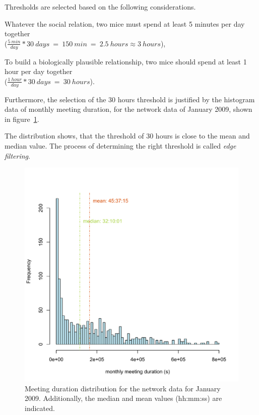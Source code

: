 Thresholds are selected based on the following considerations.
\begin{mylist}
\item Whatever the social relation, two mice must spend at least 5 minutes per day together \\ ($\frac{5\:min}{day} * 30\:days\:=\:150\:min\:=\:2.5\:hours \approx 3\:hours$),
\item To build a biologically plausible relationship, two mice should spend at least 1 hour per day together \\ ($\frac{1\:hour}{day} * 30\:days\:=\:30\:hours$).
\end{mylist}

Furthermore, the selection of the 30 hours threshold is justified by the histogram data of monthly meeting duration, for the network data of January 2009, shown in figure~\ref{fig:meeting_frequency_january}.

The distribution shows, that the threshold of 30 hours is close to the mean and median value. The process of determining the right threshold is called \textit{edge filtering}.

\begin{figure}[htpb]
\begin{center}
  \includegraphics[width=.75\textwidth]{assets/pdf/meeting_frequency_january.pdf}
  \caption[Histogram of monthly meeting duration]{Meeting duration distribution for the network data for January 2009. Additionally, the median and mean values (hh:mm:ss) are indicated.}
  \label{fig:meeting_frequency_january}
\end{center}
\end{figure}   


